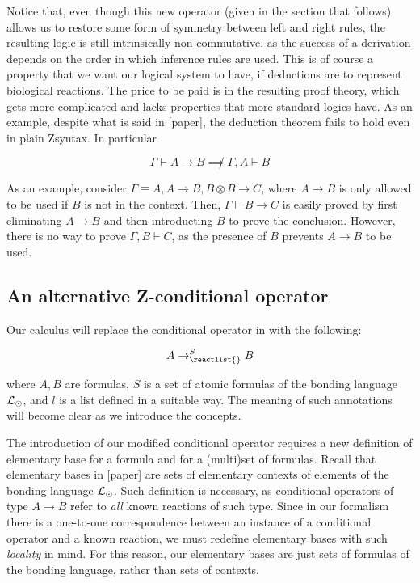 Notice that, even though this new operator (given in the section that follows)
allows us to restore some form of symmetry between left and right rules, the
resulting logic is still intrinsically non-commutative, as the success of a
derivation depends on the order in which inference rules are used. This is of
course a property that we want our logical system to have, if deductions are to
represent biological reactions. The price to be paid is in the resulting proof
theory, which gets more complicated and lacks properties that more
standard logics have. As an example, despite what is said in [paper], the
deduction theorem fails to hold even in plain Zsyntax. In particular

\[
  \Gamma \vdash A \rightarrow B \not\implies \Gamma, A \vdash B
\]

As an example, consider $\Gamma \equiv A, A \rightarrow B, B \otimes B
\rightarrow C$, where $A \rightarrow B$ is only allowed to be used if $B$ is not
in the context. Then, $\Gamma \vdash B \rightarrow C$ is easily proved by first
eliminating $A \rightarrow B$ and then introducting $B$ to prove the conclusion.
However, there is no way to prove $\Gamma, B \vdash C$, as the presence of $B$
prevents $A \rightarrow B$ to be used.

\subsection{An alternative Z-conditional operator}

Our calculus \eznd{} will replace the conditional operator in \znd{} with the
following:

\[
  A \rightarrow_{\reactlist{}}^S B
\]

where $A,B$ are formulas, $S$ is a set of atomic formulas of the bonding
language $\mathcal{L}_{\odot}$, and $l$ is a list defined in a suitable way. The
meaning of such annotations will become clear as we introduce the concepts.

The introduction of our modified conditional operator requires a new
definition of elementary base for a formula and for a (multi)set of formulas.
Recall that elementary bases in [paper] are sets of elementary contexts of
elements of the bonding language $\mathcal{L}_{\odot}$. Such definition is necessary,
as conditional operators of type $A \rightarrow B$ refer to \emph{all}
known reactions of such type. Since in our formalism there is a one-to-one
correspondence between an instance of a conditional operator and a known
reaction, we must redefine elementary bases with such \emph{locality} in mind.
For this reason, our elementary bases are just sets of formulas of the bonding
language, rather than sets of contexts.

